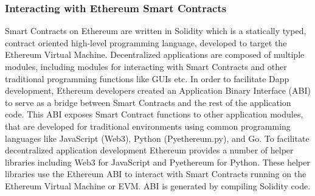 \subsubsection{Interacting with Ethereum Smart Contracts}
Smart Contracts on Ethereum are written in Solidity which is a statically typed, contract oriented high-level programming language, developed to target the Ethereum Virtual Machine. Decentralized applications are composed of multiple modules, including modules for interacting with Smart Contracts and other traditional programming functions like GUIs etc. In order to facilitate Dapp development, Ethereum developers created an Application Binary Interface (ABI) to serve as a bridge between Smart Contracts and the rest of the application code. This ABI exposes Smart Contract functions to other application modules, that are developed for traditional environments using common programming languages like JavaScript (Web3), Python (Pyethereum.py), and Go.  To facilitate decentralized application development Ethereum provides a number of helper libraries including Web3 for JavaScript and Pyethereum for Python. These helper libraries use the Ethereum ABI to interact with Smart Contracts running on the Ethereum Virtual Machine or EVM. ABI is generated by compiling Solidity code. %







